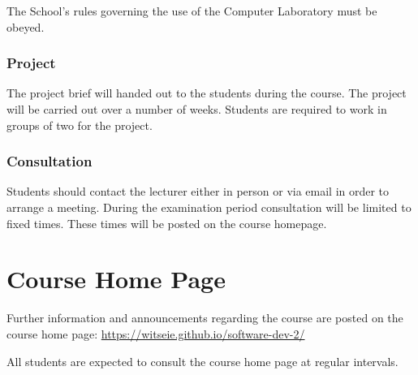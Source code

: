 \documentclass[11pt]{eie-cbo}
\begin{document}
The School's rules governing the use of the Computer Laboratory must be obeyed.

\subsubsection{Project}
The project brief will handed out to the students during the course. The
project will be carried out over a number of weeks. Students are required to
work in groups of two for the project.

\subsubsection{Consultation}
Students should contact the lecturer either in person or via email in order to arrange a meeting. During the examination period consultation will be limited to fixed times. These times will be posted on the course homepage.

\section{Course Home Page}\label{web}
Further information and announcements regarding the course are posted on the course home page: \url{https://witseie.github.io/software-dev-2/}

All students are expected to consult the course home page at regular intervals.
\end{document}
